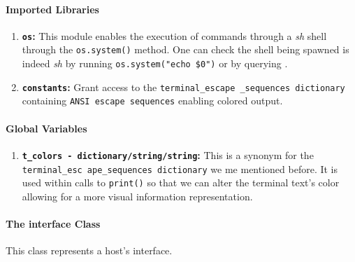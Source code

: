     \paragraph{Imported Libraries}
        \begin{enumerate}
            \item \textbf{\texttt{os}:} This module enables the execution of commands through a \textit{sh} shell through the \texttt{os.system()} method. One can check the shell being spawned is indeed \textit{sh} by running \texttt{\allowbreak os.system("echo \$0")} or by querying \cite{bib:man-system}.
            \item \textbf{\texttt{constants}:} Grant access to the \texttt{\allowbreak terminal\_escape \_sequences dictionary} containing \texttt{ANSI escape sequences} enabling colored output.
        \end{enumerate}

    \paragraph{Global Variables}
        \begin{enumerate}
            \item \textbf{\texttt{\allowbreak t\_colors - dictionary/string/string}:} This is a synonym for the \texttt{\allowbreak terminal\_esc ape\_sequences dictionary} we me mentioned before. It is used within calls to \texttt{print()} so that we can alter the terminal text's color allowing for a more visual information representation.
        \end{enumerate}

    \paragraph{The interface Class}
        This class represents a host's interface.

